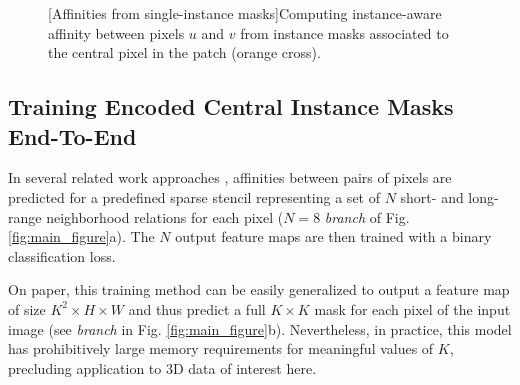 \begin{figure}[t]
\begin{minipage}[t]{0.58\textwidth}
        [Affinities from single-instance masks]{Computing instance-aware affinity between pixels $u$ and $v$ from instance masks associated to the central pixel in the patch (orange cross). 
        }
    \label{fig:mask_cases}
\end{minipage}
\end{figure}

\subsection{Training Encoded Central Instance Masks End-To-End}\label{sec:encoding_masks}
In several related work approaches \cite{liu2018affinity,Gao_2019_ICCV,lee2017superhuman,wolf2018mutex,bailoni2019generalized}, affinities between pairs of pixels are predicted for a predefined sparse stencil representing a set of $N$ short- and long-range neighborhood relations for each pixel  ($N=8$ \emph{\sparseBr branch} of Fig. \ref{fig:main_figure}a). The $N$ output feature maps  are then trained with a binary classification loss. 


On paper, this training method can be easily generalized to output a feature map of size $K^2 \times H \times W$ and thus predict a full $K\times K$ \maskname mask for each pixel of the input image (see \emph{\denseBr branch} in Fig. \ref{fig:main_figure}b).
Nevertheless, in practice, this model has prohibitively large memory requirements for meaningful values of $K$, precluding application to 3D data of interest here.

